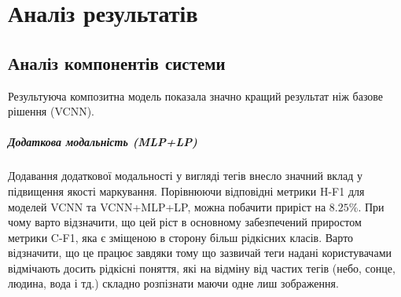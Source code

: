 \documentclass{udstu}
\begin{document}
\chapter{Аналіз результатів}

\section{Аналіз компонентів системи}

\begin{center}
\end{center}

Результуюча композитна модель показала значно кращий результат ніж базове рішення (VCNN).

\paragraph{\textbf{Додаткова модальність (MLP+LP)}\\}

Додавання додаткової модальності у вигляді тегів внесло значний вклад
у підвищення якості маркування.
Порівнюючи відповідні метрики H-F1 для моделей VCNN та VCNN+MLP+LP, можна
побачити приріст на $8.25\%$. При чому варто відзначити, що цей ріст в основному
забезпечений приростом метрики C-F1, яка є зміщеною в сторону більш рідкісних класів.
Варто відзначити, що це працює завдяки тому що зазвичай теги надані користувачами відмічають
досить рідкісні поняття, які на відміну від частих тегів (небо, сонце, людина, вода і тд.) складно
розпізнати маючи одне лиш зображення.
\end{document}
